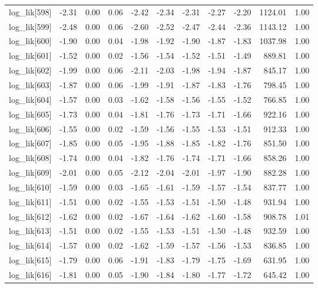 \begin{table}[ht]
\begin{tabular}{rrrrrrrrrrr}
  log\_lik[598] & -2.31 & 0.00 & 0.06 & -2.42 & -2.34 & -2.31 & -2.27 & -2.20 & 1124.01 & 1.00 \\ 
  log\_lik[599] & -2.48 & 0.00 & 0.06 & -2.60 & -2.52 & -2.47 & -2.44 & -2.36 & 1143.12 & 1.00 \\ 
  log\_lik[600] & -1.90 & 0.00 & 0.04 & -1.98 & -1.92 & -1.90 & -1.87 & -1.83 & 1037.98 & 1.00 \\ 
  log\_lik[601] & -1.52 & 0.00 & 0.02 & -1.56 & -1.54 & -1.52 & -1.51 & -1.49 & 889.81 & 1.00 \\ 
  log\_lik[602] & -1.99 & 0.00 & 0.06 & -2.11 & -2.03 & -1.98 & -1.94 & -1.87 & 845.17 & 1.00 \\ 
  log\_lik[603] & -1.87 & 0.00 & 0.06 & -1.99 & -1.91 & -1.87 & -1.83 & -1.76 & 798.45 & 1.00 \\ 
  log\_lik[604] & -1.57 & 0.00 & 0.03 & -1.62 & -1.58 & -1.56 & -1.55 & -1.52 & 766.85 & 1.00 \\ 
  log\_lik[605] & -1.73 & 0.00 & 0.04 & -1.81 & -1.76 & -1.73 & -1.71 & -1.66 & 922.16 & 1.00 \\ 
  log\_lik[606] & -1.55 & 0.00 & 0.02 & -1.59 & -1.56 & -1.55 & -1.53 & -1.51 & 912.33 & 1.00 \\ 
  log\_lik[607] & -1.85 & 0.00 & 0.05 & -1.95 & -1.88 & -1.85 & -1.82 & -1.76 & 851.50 & 1.00 \\ 
  log\_lik[608] & -1.74 & 0.00 & 0.04 & -1.82 & -1.76 & -1.74 & -1.71 & -1.66 & 858.26 & 1.00 \\ 
  log\_lik[609] & -2.01 & 0.00 & 0.05 & -2.12 & -2.04 & -2.01 & -1.97 & -1.90 & 882.28 & 1.00 \\ 
  log\_lik[610] & -1.59 & 0.00 & 0.03 & -1.65 & -1.61 & -1.59 & -1.57 & -1.54 & 837.77 & 1.00 \\ 
  log\_lik[611] & -1.51 & 0.00 & 0.02 & -1.55 & -1.53 & -1.51 & -1.50 & -1.48 & 931.94 & 1.00 \\ 
  log\_lik[612] & -1.62 & 0.00 & 0.02 & -1.67 & -1.64 & -1.62 & -1.60 & -1.58 & 908.78 & 1.01 \\ 
  log\_lik[613] & -1.51 & 0.00 & 0.02 & -1.55 & -1.53 & -1.51 & -1.50 & -1.48 & 932.59 & 1.00 \\ 
  log\_lik[614] & -1.57 & 0.00 & 0.02 & -1.62 & -1.59 & -1.57 & -1.56 & -1.53 & 836.85 & 1.00 \\ 
  log\_lik[615] & -1.79 & 0.00 & 0.06 & -1.91 & -1.83 & -1.79 & -1.75 & -1.69 & 631.95 & 1.00 \\ 
  log\_lik[616] & -1.81 & 0.00 & 0.05 & -1.90 & -1.84 & -1.80 & -1.77 & -1.72 & 645.42 & 1.00 \\ 

\end{tabular}
\end{table}
